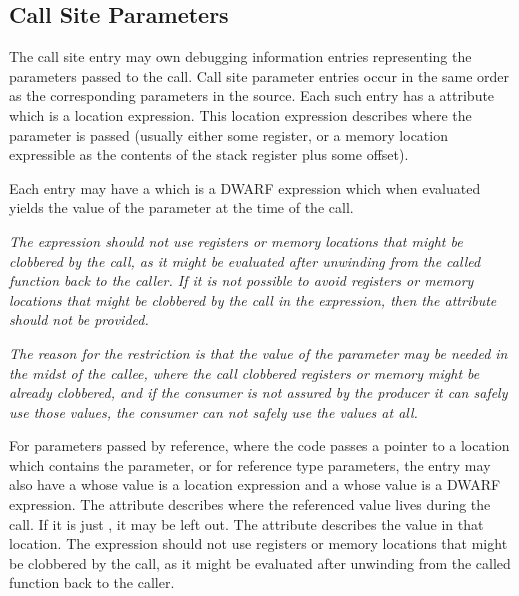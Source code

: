 \bb
\subsection{Call Site Parameters}
\eb
\label{chap:callsiteparameters}
The call site entry may own 
\DWTAGcallsiteparameterTARG{} 
debugging information entries representing the parameters passed to the call.
\bb
Call site parameter entries occur in the same order as the corresponding
parameters in the source.
\eb
Each such entry has a \DWATlocation{} attribute which is a location expression.
This location expression describes where the parameter is passed
(usually either some register, or a memory location expressible as the
contents of the stack register plus some offset).

Each \DWTAGcallsiteparameter{} entry may have a 
\DWATcallvalueDEFN{}
which is a DWARF expression 
which when evaluated yields the value of the parameter at the time of the call.

\textit{The expression should not use registers or memory
locations that might be clobbered by the call, as it might be evaluated after
unwinding from the called function back to the caller.  If it is not
possible to avoid registers or memory locations that might be clobbered by
the call in the expression, then the \DWATcallvalueNAME{} attribute should
not be provided.}

\textit{The reason for the restriction is that the value of the parameter may be
needed in the midst of the callee, where the call clobbered registers or
memory might be already clobbered, and if the consumer is not assured by
the producer it can safely use those values, the consumer can not safely
use the values at all.}

For parameters passed by reference, where the code passes a pointer to
a location which contains the parameter, or for reference type parameters,
the \DWTAGcallsiteparameter{} entry may also have a
\DWATcalldatalocationNAME{}
whose value is a location expression and a
\DWATcalldatavalueNAME{}
whose value is a DWARF expression.  The \DWATcalldatalocationDEFN{} attribute
describes where the referenced value lives during the call.  If it is just 
\DWOPpushobjectaddress{}, it may be left out.  The 
\DWATcalldatavalueNAME{} attribute describes the value in that location. 
The expression should not use registers or memory
locations that might be clobbered by the call, as it might be evaluated after
unwinding from the called function back to the caller.

